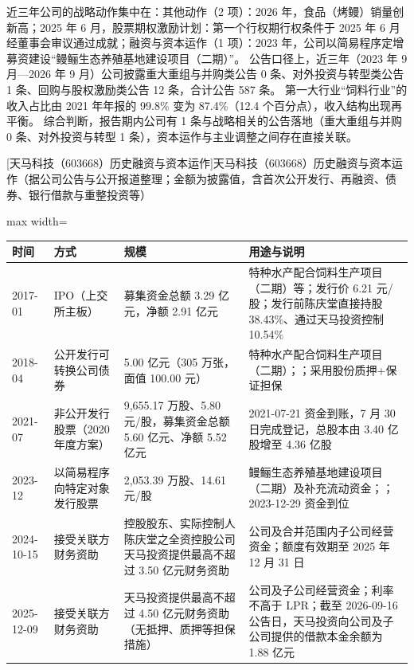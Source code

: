  近三年公司的战略动作集中在：其他动作（2 项）：2026 年，食品（烤鳗）销量创新高；2025 年 6 月，股票期权激励计划：第一个行权期行权条件于 2025 年 6 月经董事会审议通过成就；融资与资本运作（1 项）：2023 年，公司以简易程序定增募资建设“鳗鲡生态养殖基地建设项目（二期）”。 公告口径上，近三年（2023 年 9 月---2026 年 9 月）公司披露重大重组与并购类公告 0 条、对外投资与转型类公告 1 条、回购与股权激励类公告 12 条，合计公告 587 条。 第一大行业“饲料行业”的收入占比由 2021 年年报的 99.8\% 变为 87.4\%（12.4 个百分点），收入结构出现再平衡。 综合判断，报告期内公司有 1 条与战略相关的公告落地（重大重组与并购 0 条、对外投资与转型 1 条），资本运作与主业调整之间存在直接关联。

\begin{center}\small\setlength{\tabcolsep}{4pt}
[天马科技（603668）历史融资与资本运作]{天马科技（603668）历史融资与资本运作（据公司公告与公开报道整理；金额为披露值，含首次公开发行、再融资、债券、银行借款与重整投资等）}
\begin{adjustbox}{max width=\textwidth}
\begin{tabular}{@{}p{1.45cm}p{2.55cm}p{4.05cm}p{4.95cm}@{}}
\toprule
时间 & 方式 & 规模 & 用途与说明 \\
\midrule
2017-01 & IPO（上交所主板） & 募集资金总额 3.29 亿元，\allowbreak{}净额 2.91 亿元 & 特种水产配合饲料生产项目（二期）等；发行价 6.21 元/\allowbreak{}股；发行前陈庆堂直接持股 38.43\%、\allowbreak{}通过天马投资控制 10.54\% \\
2018-04 & 公开发行可转换公司债券 & 5.00 亿元（305 万张，\allowbreak{}面值 100.00 元） & 特种水产配合饲料生产项目（二期）；；采用股份质押+保证担保 \\
2021-07 & 非公开发行股票（2020 年度方案） & 9,\allowbreak{}655.17 万股、\allowbreak{}5.80 元/\allowbreak{}股，\allowbreak{}募集资金总额 5.60 亿元、\allowbreak{}净额 5.52 亿元 & 2021-07-21 资金到账，\allowbreak{}7 月 30 日完成登记，\allowbreak{}总股本由 3.40 亿股增至 4.36 亿股 \\
2023-12 & 以简易程序向特定对象发行股票 & 2,\allowbreak{}053.39 万股、\allowbreak{}14.61 元/\allowbreak{}股 & 鳗鲡生态养殖基地建设项目（二期）及补充流动资金；；2023-12-29 资金到位 \\
2024-10-15 & 接受关联方财务资助 & 控股股东、\allowbreak{}实际控制人陈庆堂之全资控股公司天马投资提供最高不超过 3.50 亿元财务资助 & 公司及合并范围内子公司经营资金；额度有效期至 2025 年 12 月 31 日 \\
2025-12-09 & 接受关联方财务资助 & 天马投资提供最高不超过 4.50 亿元财务资助（无抵押、\allowbreak{}质押等担保措施） & 公司及子公司经营资金；利率不高于 LPR；截至 2026-09-16 公告日，\allowbreak{}天马投资向公司及子公司提供的借款本金余额为 1.88 亿元 \\
\bottomrule
\end{tabular}
\end{adjustbox}
\end{center}

